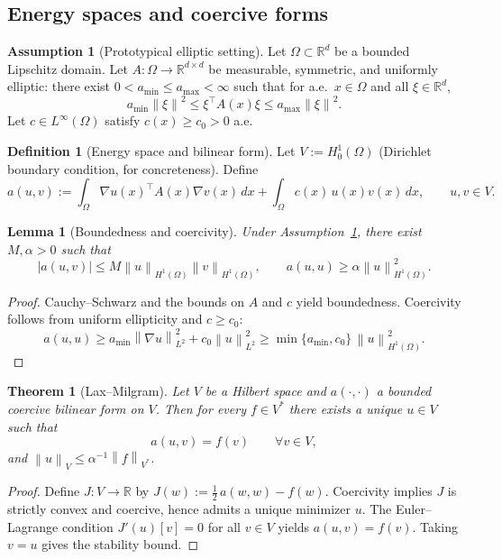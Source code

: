 \documentclass[11pt]{article}
\theoremstyle{definition}
\newtheorem{definition}{Definition}[section]
\newtheorem{assumption}{Assumption}[section]
\theoremstyle{plain}
\newtheorem{theorem}{Theorem}[section]
\newtheorem{lemma}{Lemma}[section]
\theoremstyle{remark}
\newcommand{\R}{\mathbb{R}}
\newcommand{\norm}[1]{\left\lVert #1\right\rVert}
\begin{document}
\subsection{Energy spaces and coercive forms}

\begin{assumption}[Prototypical elliptic setting]\label{ass:elliptic}
Let $\Omega\subset\R^d$ be a bounded Lipschitz domain.
Let $A:\Omega\to\R^{d\times d}$ be measurable, symmetric, and uniformly elliptic: there exist
$0<a_{\min}\le a_{\max}<\infty$ such that for a.e.\ $x\in\Omega$ and all $\xi\in\R^d$,
\[
a_{\min}\norm{\xi}^2 \le \xi^\top A(x)\xi \le a_{\max}\norm{\xi}^2.
\]
Let $c\in L^\infty(\Omega)$ satisfy $c(x)\ge c_0>0$ a.e.
\end{assumption}

\begin{definition}[Energy space and bilinear form]\label{def:energy}
Let $V:=H^1_0(\Omega)$ (Dirichlet boundary condition, for concreteness).
Define
\[
a(u,v)
:=\int_\Omega \nabla u(x)^\top A(x)\nabla v(x)\,dx
+\int_\Omega c(x)\,u(x)v(x)\,dx,
\qquad u,v\in V.
\]
\end{definition}

\begin{lemma}[Boundedness and coercivity]\label{lem:coercive}
Under Assumption~\ref{ass:elliptic}, there exist $M,\alpha>0$ such that
\[
|a(u,v)|\le M\norm{u}_{H^1(\Omega)}\norm{v}_{H^1(\Omega)},\qquad
a(u,u)\ge \alpha\norm{u}_{H^1(\Omega)}^2.
\]
\end{lemma}

\begin{proof}
Cauchy--Schwarz and the bounds on $A$ and $c$ yield boundedness. Coercivity follows from uniform ellipticity and $c\ge c_0$:
\[
a(u,u)\ge a_{\min}\norm{\nabla u}_{L^2}^2+c_0\norm{u}_{L^2}^2
\ge \min\{a_{\min},c_0\}\,\norm{u}_{H^1(\Omega)}^2.
\]
\end{proof}

\begin{theorem}[Lax--Milgram]\label{thm:laxmilgram}
Let $V$ be a Hilbert space and $a(\cdot,\cdot)$ a bounded coercive bilinear form on $V$.
Then for every $f\in V^\ast$ there exists a unique $u\in V$ such that
\[
a(u,v)=f(v)\qquad\forall v\in V,
\]
and $\norm{u}_V\le \alpha^{-1}\norm{f}_{V^\ast}$.
\end{theorem}

\begin{proof}
Define $J:V\to\R$ by $J(w):=\frac12\,a(w,w)-f(w)$.
Coercivity implies $J$ is strictly convex and coercive, hence admits a unique minimizer $u$.
The Euler--Lagrange condition $J'(u)[v]=0$ for all $v\in V$ yields $a(u,v)=f(v)$.
Taking $v=u$ gives the stability bound.
\end{proof}
\end{document}
